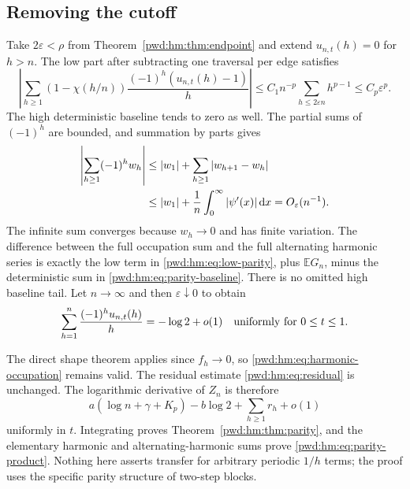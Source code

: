 \documentclass[11pt,letterpaper]{article}
\numberwithin{equation}{section}
\theoremstyle{remark}\newtheorem{remark}[theorem]{Remark}
\newcommand{\E}{\mathbb E}\newcommand{\Prob}{\mathbb P}
\begin{document}
\subsection{Removing the cutoff}
Take $2\varepsilon<\rho$ from Theorem~\ref{pwd:hm:thm:endpoint} and extend $u_{n,t}(h)=0$ for $h>n$. The low part after subtracting one traversal per edge satisfies
\begin{equation}\label{pwd:hm:eq:low-parity}
 \left|\sum_{h\ge1}(1-\chi(h/n))\frac{(-1)^h(u_{n,t}(h)-1)}h\right|
 \le C_1n^{-p}\sum_{h\le2\varepsilon n}h^{p-1}\le C_p\varepsilon^p.
\end{equation}
The high deterministic baseline tends to zero as well. The partial sums of $(-1)^h$ are bounded, and summation by parts gives
\begin{align}\label{pwd:hm:eq:parity-baseline}
 \left|\sum_{h\ge1}(-1)^hw_h\right|
 &\le |w_1|+\sum_{h\ge1}|w_{h+1}-w_h|\notag\\
 &\le |w_1|+\frac1n\int_0^\infty|\psi'(x)|\,\mathrm d x=O_\varepsilon(n^{-1}).
\end{align}
The infinite sum converges because $w_h\to0$ and has finite variation. The difference between the full occupation sum and the full alternating harmonic series is exactly the low term in \eqref{pwd:hm:eq:low-parity}, plus $\E G_n$, minus the deterministic sum in \eqref{pwd:hm:eq:parity-baseline}. There is no omitted high baseline tail. Let $n\to\infty$ and then $\varepsilon\downarrow0$ to obtain
\begin{equation}\label{pwd:hm:eq:parity-occupation}
 \sum_{h=1}^n\frac{(-1)^hu_{n,t}(h)}h=-\log2+o(1)
 \quad\hbox{uniformly for }0\le t\le1.
\end{equation}

The direct shape theorem applies since $f_h\to0$, so \eqref{pwd:hm:eq:harmonic-occupation} remains valid. The residual estimate \eqref{pwd:hm:eq:residual} is unchanged. The logarithmic derivative of $Z_n$ is therefore
\[
 a(\log n+\gamma+K_p)-b\log2+\sum_{h\ge1}r_h+o(1)
\]
uniformly in $t$. Integrating proves Theorem~\ref{pwd:hm:thm:parity}, and the elementary harmonic and alternating-harmonic sums prove \eqref{pwd:hm:eq:parity-product}. Nothing here asserts transfer for arbitrary periodic $1/h$ terms; the proof uses the specific parity structure of two-step blocks.
\end{document}
